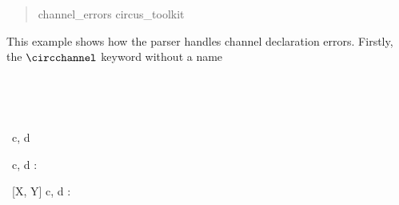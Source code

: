 \documentclass{article}
\newenvironment{zsection}{\begin{quotation}}{\end{quotation}}
\begin{document}
\begin{zsection}
   \SECTION channel\_errors \parents circus\_toolkit
\end{zsection}

This example shows how the parser handles channel declaration errors.
Firstly, the $\circchannel$ keyword without a name
\begin{circus}
    \circchannel\   
\end{circus}

\begin{cirucs}    
    \circchannelfrom\ 
\end{cirucs}

\begin{circus}
   \circchannel\ c, d \someunknowncmd
\end{circus}

\begin{circus}
   \circchannel\ c, d : \\
\end{circus}

\begin{circus}
   \circchannel\ [X, Y] c, d : \\
\end{circus}
\end{document}
